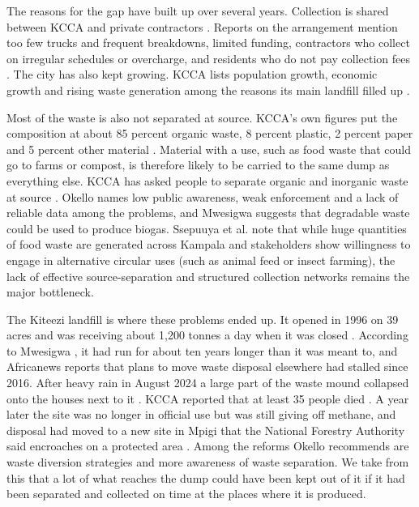 The reasons for the gap have built up over several years. Collection is shared between KCCA and private contractors \cite{kccand}. Reports on the arrangement mention too few trucks and frequent breakdowns, limited funding, contractors who collect on irregular schedules or overcharge, and residents who do not pay collection fees \cite{ngwomoya,mwesigwa}. The city has also kept growing. KCCA lists population growth, economic growth and rising waste generation among the reasons its main landfill filled up \cite{kcca2026}.

Most of the waste is also not separated at source. KCCA's own figures put the composition at about 85 percent organic waste, 8 percent plastic, 2 percent paper and 5 percent other material \cite{kcca2026}. Material with a use, such as food waste that could go to farms or compost, is therefore likely to be carried to the same dump as everything else. KCCA has asked people to separate organic and inorganic waste at source \cite{kccand}. Okello \cite{okello} names low public awareness, weak enforcement and a lack of reliable data among the problems, and Mwesigwa \cite{mwesigwa} suggests that degradable waste could be used to produce biogas. Ssepuuya et al. \cite{ssepuuya} note that while huge quantities of food waste are generated across Kampala and stakeholders show willingness to engage in alternative circular uses (such as animal feed or insect farming), the lack of effective source-separation and structured collection networks remains the major bottleneck.

The Kiteezi landfill is where these problems ended up. It opened in 1996 on 39 acres and was receiving about 1,200 tonnes a day when it was closed \cite{kcca2026}. According to Mwesigwa \cite{mwesigwa}, it had run for about ten years longer than it was meant to, and Africanews \cite{africanews} reports that plans to move waste disposal elsewhere had stalled since 2016. After heavy rain in August 2024 a large part of the waste mound collapsed onto the houses next to it \cite{petley,okello}. KCCA reported that at least 35 people died \cite{kcca2024b}. A year later the site was no longer in official use but was still giving off methane, and disposal had moved to a new site in Mpigi that the National Forestry Authority said encroaches on a protected area \cite{afp}. Among the reforms Okello \cite{okello} recommends are waste diversion strategies and more awareness of waste separation. We take from this that a lot of what reaches the dump could have been kept out of it if it had been separated and collected on time at the places where it is produced.

